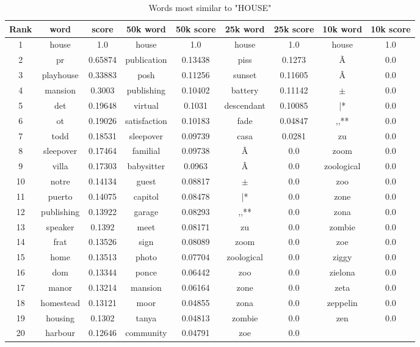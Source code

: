 \documentclass[10pt, a4paper, oneside]{article} %
\begin{document}
\pagebreak


\begin{table}[!h]
\centering
\begin{tabular}{ | c | c | c | | c | c || c | c || c | c |}
\hline
Rank & word & score  & 50k word & 50k score & 25k word & 25k score & 10k word & 10k score\\ \hline
1 & house & 1.0 &house & 1.0 &house & 1.0 &house & 1.0 \\
2 & pr & 0.65874 &publication & 0.13438 &piss & 0.1273 &Ã & 0.0 \\
3 & playhouse & 0.33883 &posh & 0.11256 &sunset & 0.11605 &Â & 0.0 \\
4 & mansion & 0.3003 &publishing & 0.10402 &battery & 0.11142 &$\pm$ & 0.0 \\
5 & det & 0.19648 &virtual & 0.1031 &descendant & 0.10085 &|* & 0.0 \\
6 & ot & 0.19026 &satisfaction & 0.10183 &fade & 0.04847 &,,** & 0.0 \\
7 & todd & 0.18531 &sleepover & 0.09739 &casa & 0.0281 &zu & 0.0 \\
8 & sleepover & 0.17464 &familial & 0.09738 &Ã & 0.0 &zoom & 0.0 \\
9 & villa & 0.17303 &babysitter & 0.0963 &Â & 0.0 &zoological & 0.0 \\
10 & notre & 0.14134 &guest & 0.08817 &$\pm$ & 0.0 &zoo & 0.0 \\
11 & puerto & 0.14075 &capitol & 0.08478 &|* & 0.0 &zone & 0.0 \\
12 & publishing & 0.13922 &garage & 0.08293 &,,** & 0.0 &zona & 0.0 \\
13 & speaker & 0.1392 &meet & 0.08171 &zu & 0.0 &zombie & 0.0 \\
14 & frat & 0.13526 &sign & 0.08089 &zoom & 0.0 &zoe & 0.0 \\
15 & home & 0.13513 &photo & 0.07704 &zoological & 0.0 &ziggy & 0.0 \\
16 & dom & 0.13344 &ponce & 0.06442 &zoo & 0.0 &zielona & 0.0 \\
17 & manor & 0.13214 &mansion & 0.06164 &zone & 0.0 &zeta & 0.0 \\
18 & homestead & 0.13121 &moor & 0.04855 &zona & 0.0 &zeppelin & 0.0 \\
19 & housing & 0.1302 &tanya & 0.04813 &zombie & 0.0 &zen & 0.0 \\
20 & harbour & 0.12646 &community & 0.04791 &zoe & 0.0 \\
 \hline
\end{tabular}
\caption{Words most similar to "HOUSE"}
\label{house}
\end{table}
\end{document}
